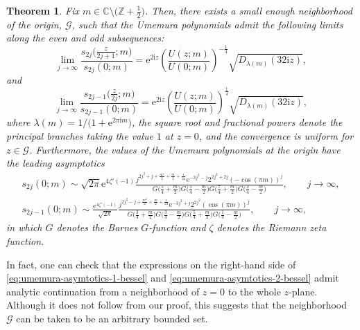 \documentclass[11pt]{article}
\numberwithin{equation}{section}
\numberwithin{equation}{section}
\newtheorem{Theorem}{Theorem}[section]
\newcommand{\ee}{\mathrm{e}}
\newcommand{\ii}{\mathrm{i}}
\newcommand{\C}{{\mathbb{C}}}
\newcommand{\Z}{{\mathbb{Z}}}
\newcommand\lb{\left(}
\newcommand\rb{\right)}
\begin{document}
\begin{Theorem}\label{thm:umemura_asym}
Fix $m \in \C \setminus \big(\Z + \frac{1}{2}\big)$. Then, there exists a small enough neighborhood of the origin, $\mathcal{G}$, such that the Umemura polynomials admit the following limits along the even and odd subsequences:
\begin{equation}
 \lim_{j\to\infty}\frac{s_{2j}\big( \frac{z}{2j+1};m \big)}{s_{2j}(0;m)}=\ee^{2\ii z}\left(\frac{U(z;m)}{U(0;m)}\right)^{-\frac{1}{4}} \sqrt{D_{\lambda(m)}\lb 32\ii z\rb},
\label{eq:umemura-asymtotics-1-bessel}
\end{equation}
and
\begin{equation}
 \lim_{j\to\infty}\frac{s_{2j-1} \big(\frac{z}{2j} ;m\big)}{s_{2j-1}(0;m)}=\ee^{2\ii z}\left(\frac{U(z;m)}{U(0;m)}\right)^{\frac{1}{4}} \sqrt{D_{\lambda(m)}\lb 32\ii z\rb},
\label{eq:umemura-asymtotics-2-bessel}
\end{equation}
where $\lambda(m)=1/\big(1+\ee^{2\pi \ii m}\big)$, the square root and fractional powers denote the principal branches taking the value $1$ at $z=0$, and the convergence is uniform for $z\in\mathcal{G}$. Furthermore,
the values of the Umemura polynomials at the origin have the leading asymptotics
\begin{gather}
 s_{2j}(0;m)\sim\sqrt{2\pi}\ee^{4\zeta'(-1)}\frac{j^{2j^2+j+\frac{m^2}{2}+\frac{m}{2}+\frac{1}{24}}\ee^{-3j^2-j}2^{2j^2+2j}(-\cos(\pi m))^j}{G\big(\frac{5}{4}+\frac{m}{2}\big)G\big(\frac{5}{4}-\frac{m}{2}\big)G\big(\frac{7}{4}+\frac{m}{2}\big)G\big(\frac{3}{4}-\frac{m}{2}\big)},\qquad j\to\infty,\label{eq:umemura-zero-asym-even}
\\
 s_{2j-1}(0;m)\sim\frac{\ee^{4\zeta'(-1)}}{\sqrt{2\pi}}\frac{j^{2j^2-j+\frac{m^2}{2}+\frac{m}{2}+\frac{1}{24}}\ee^{-3j^2+j}2^{2j^2}(\cos(\pi m))^j}{G\big(\frac{3}{4}+\frac{m}{2}\big)G\big(\frac{3}{4}-\frac{m}{2}\big)G\big(\frac{5}{4}+\frac{m}{2}\big)G\big(\frac{1}{4}-\frac{m}{2}\big)},\qquad j\to\infty,\label{eq:umemura-zero-asym-odd}
\end{gather}
in which $G$ denotes the Barnes $G$-function and $\zeta$ denotes the Riemann zeta function.
\end{Theorem}
In fact, one can check that the expressions on the right-hand side of \eqref{eq:umemura-asymtotics-1-bessel} and \eqref{eq:umemura-asymtotics-2-bessel} admit analytic continuation from a neighborhood of $z=0$ to the whole $z$-plane. Although it does not follow from our proof, this suggests that the neighborhood $\mathcal{G}$ can be taken to be an arbitrary bounded set.
\end{document}

